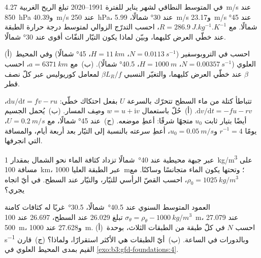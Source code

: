 \begin{exercise}[$\star\star$]\label{exo:b3:gfd-foundations:8}
في المتوسط النطاقي لشهر يناير للفترة 1991--2020 تبلغ الريح الغربية \qty{4.27}{m/s}
عند \qty{850}{hPa} و\qty{40.39}{m/s} عند \qty{250}{hPa}، عند \ang{30} شمالًا،
\qty{5.99}{m/s} و\qty{23.17}{m/s} عند \ang{45} شمالًا. مع $R =
\qty{286.9}{J.kg^{-1}.K^{-1}}$، احسب التدرّج الزوالي لمتوسط درجة حرارة
الطبقة عند خطّي العرض كليهما، وبيّن لماذا يكون التيّار النفّاث أقوى
عند \ang{30} شمالًا.
\end{exercise}

\begin{exercise}[$\star\star$]\label{exo:b3:gfd-foundations:9}
(أ)~احسب  في التروبوسفير ($N =
\qty{0.0113}{s^{-1}}$، $H = \qty{11}{km}$، \ang{45} شمالًا) وفي المحيط العلوي
($N = \qty{0.00357}{s^{-1}}$، $H = \qty{1000}{m}$، \ang{40.5} شمالًا).
(ب)~مع $a = \qty{6371}{km}$، احسب $\beta$ عند خطّي العرض كليهما، والتغيّر النسبي
$\beta L_R/f$ لمعامل كوريوليس عبر كلّ نصف قطر.
\end{exercise}

\begin{exercise}[$\star\star\star$]\label{exo:b3:gfd-foundations:10}
تتباطأ كتلة من ماء السطح تتحرّك بالسرعة $U$ بفعل احتكاك
خطّي: $\mathrm du/\mathrm dt = fv - ru$، $\mathrm dv/\mathrm dt = -fu -
rv$. (أ)~حُلّ باستعمال $w = u + \mathrm iv$ وصِف المسار. (ب)~يُحمل
الجسيم أيضًا بتيار ثابت $u_0$ متجهًا شرقًا: أعطِ موضعه.
(ج)~عند \ang{45} شمالًا، مع $U = \qty{0.2}{m/s}$، $r^{-1} =
\num{4}\text{ يومًا}$ و$u_0 = \qty{0.05}{m/s}$، أعطِ سرعته بالنسبة إلى
التيّار بعد أربعة أيام، والمسافة التي انجرفها.
\end{exercise}

\begin{exercise}[$\star\star\star$]\label{exo:b3:gfd-foundations:11}
عبر جبهة محيطية عند \ang{40}~شمالًا تزداد كثافة الماء
نحو الشمال بمقدار \qty{1}{kg/m^3} على مسافة \qty{100}{km}، عبر الطبقة العليا
\qty{1000}{m}؛ وتحتها يكون الماء متجانسًا وساكنًا. مع $\rho_0 =
\qty{1025}{kg/m^3}$، احسب القصّ الرأسي للتيّار،
والتيّار عند السطح. في أيّ اتجاه يجري؟
\end{exercise}

\begin{exercise}[$\star\star\star$]\label{exo:b3:gfd-foundations:12}
العمود المتوسط السنوي عند \ang{40.5}~شمالًا، \ang{30.5}~غربًا له كثافات كامنة
$\sigma_\theta = \rho_\theta - \qty{1000}{kg/m^3}$ تبلغ 26.029 عند
السطح، 26.697 عند \qty{100}{m}، 27.079 عند \qty{500}{m}، و27.628 عند
\qty{1000}{m}. (أ)~احسب $N$ في كلّ طبقة من الطبقات الثلاث، بوحدة
\unit{s^{-1}} وبالدورات في الساعة. (ب)~أيّ الطبقات هي الأكثر استقرارًا،
ولماذا؟ (ج)~قارن القيم بمدى المحيط العلوي في
\cref{exo:b3:gfd-foundations:4}.
\end{exercise}


